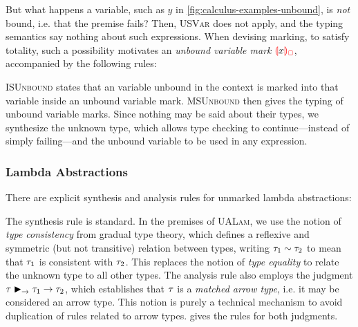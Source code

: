 But what happens a variable, such as $y$ in \cref{fig:calculus-examples-unbound}, is \emph{not}
bound, i.e. that the premise fails? Then, \textsc{USVar} does not apply, and the typing semantics
say nothing about such expressions. When devising marking, to satisfy totality, such a possibility
motivates an \emph{unbound variable mark} $\ECUnbound{x}$, accompanied by the following rules:
%
\begin{mathpar}

\end{mathpar}
%
\textsc{ISUnbound} states that an variable unbound in the context is marked into that variable
inside an unbound variable mark. \textsc{MSUnbound} then gives the typing of unbound variable marks.
Since nothing may be said about their types, we synthesize the unknown type, which allows type
checking to continue---instead of simply failing---and the unbound variable to be used in any
expression. %

\subsubsection{Lambda Abstractions}
\label{sec:calculus-lambda-abstractions}

There are explicit synthesis and analysis rules for unmarked lambda abstractions:
%
\begin{mathpar}

\end{mathpar}
%
The synthesis rule is standard. In the premises of \textsc{UALam}, we use the notion of
\emph{type consistency} from gradual type theory, which defines a reflexive and symmetric (but not
transitive) relation between types, writing $\consistent{\TMV_1}{\TMV_2}$ to mean that $\TMV_1$ is
consistent with $\TMV_2$. This replaces the notion of \emph{type equality} to relate the unknown
type to all other types. The analysis rule also employs the judgment
$\matchedArrow{\TMV}{\TMV_1}{\TMV_2}$, which establishes that $\TMV$ is a \emph{matched arrow type},
i.e. it may be considered an arrow type. This notion is purely a technical mechanism to avoid
duplication of rules related to arrow types.  gives the
rules for both judgments.


